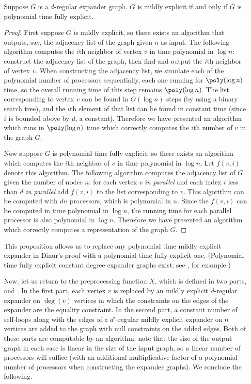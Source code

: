 \documentclass{article}
\begin{document}
\begin{proposition}
  Suppose $G$ is a $d$-regular expander graph.
  $G$ is \NC{} mildly explicit if and only if $G$ is polynomial time fully explicit.
\end{proposition}
\begin{proof}
  First suppose $G$ is \NC{} mildly explicit, so there exists an \NC{} algorithm that outputs, say, the adjacency list of the graph given $n$ as input.
  The following algorithm computes the $i$th neighbor of vertex $v$ in time polynomial in $\log n$: construct the adjacency list of the graph, then find and output the $i$th neighbor of vertex $v$.
  When constructing the adjacency list, we simulate each of the polynomial number of processors sequentially, each one running for $\poly(\log n)$ time, so the overall running time of this step remains $\poly(\log n)$.
  The list corresponding to vertex $v$ can be found in $O(\log n)$ steps (by using a binary search tree), and the $i$th element of that list can be found in constant time (since $i$ is bounded above by $d$, a constant).
  Therefore we have presented an algorithm which runs in $\poly(\log n)$ time which correctly computes the $i$th number of $v$ in the graph $G$.

  Now suppose $G$ is polynomial time fully explicit, so there exists an algorithm which computes the $i$th neighbor of $v$ in time polynomial in $\log n$.
  Let $f(v, i)$ denote this algorithm.
  The following \NC{} algorithm computes the adjacency list of $G$ given the number of nodes $n$: for each vertex $v$ \emph{in parallel} and each index $i$ less than $d$ \emph{in parallel} add $f(v, i)$ to the list corresponding to $v$.
  This algorithm can be computed with $dn$ processors, which is polynomial in $n$.
  Since the $f(v, i)$ can be computed in time polynomial in $\log n$, the running time for each parallel processor is also polynomial in $\log n$.
  Therefore we have presented an \NC{} algorithm which correctly computes a representation of the graph $G$.
\end{proof}

This proposition allows us to replace any polynomial time mildly explicit expander in Dinur's proof with a polynomial time fully explicit one.
(Polynomial time fully explicit constant degree expander graphs exist; see \cite{rvw00}, for example.)

Now, let us return to the preprocessing function $X$, which is defined in two parts, \cite[Definition~4.1]{dinur07} and \cite[Definition~4.2]{dinur07}.
In the first part, each vertex $v$ is replaced by an \NC{} mildly explicit $d$-regular expander on $\deg(v)$ vertices in which the constraints on the edges of the expander are the equality constraint.
In the second part, a constant number of self-loops along with the edges of a $d'$-regular \NC{} mildly explicit expander on $n$ vertices are added to the graph with null constraints on the added edges.
Both of these parts are computable by an \NC{} algorithm; note that the size of the output graph in each case is linear in the size of the input graph, so a linear number of processors will suffice (with an additional multiplicative factor of a polynomial number of processors when constructing the expander graphs).
We conclude the following.
\end{document}
